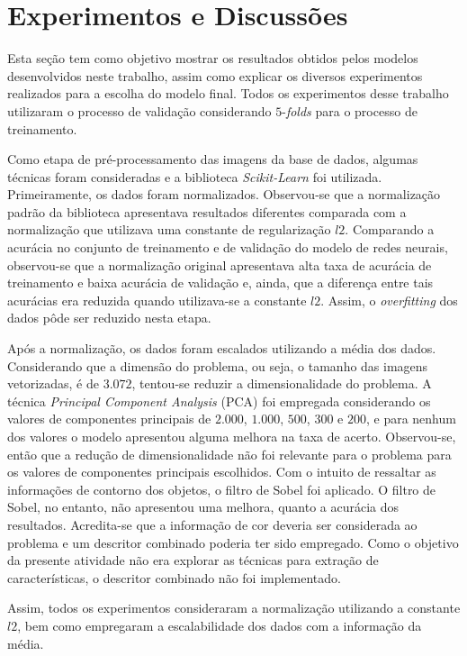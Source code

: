 \documentclass[conference]{IEEEtran}
\begin{document}
\section{Experimentos e Discussões} \label{sec:exp}

Esta seção tem como objetivo mostrar os resultados obtidos pelos modelos desenvolvidos neste trabalho, assim como explicar os diversos experimentos realizados para a escolha do modelo final. Todos os experimentos desse trabalho utilizaram o processo de validação considerando $5$-\emph{folds} para o processo de treinamento. 

Como etapa de pré-processamento das imagens da base de dados, algumas técnicas foram consideradas e a biblioteca \emph{Scikit-Learn} foi utilizada. Primeiramente, os dados foram normalizados. Observou-se que a normalização padrão da biblioteca apresentava resultados diferentes comparada com a normalização que utilizava uma constante de regularização $l2$. Comparando a acurácia no conjunto de treinamento e de validação do modelo de redes neurais, observou-se que a normalização original apresentava alta taxa de acurácia de treinamento e baixa acurácia de validação e, ainda, que a diferença entre tais acurácias era reduzida quando utilizava-se a constante $l2$. Assim, o \emph{overfitting} dos dados pôde ser reduzido nesta etapa.

Após a normalização, os dados foram escalados utilizando a média dos dados. Considerando que a dimensão do problema, ou seja, o tamanho das imagens vetorizadas, é de $3.072$, tentou-se reduzir a dimensionalidade do problema.  A técnica \emph{Principal Component Analysis} (PCA) foi empregada considerando os valores de componentes principais de $2.000$, $1.000$, $500$, $300$ e $200$, e para nenhum dos valores o modelo apresentou alguma melhora na taxa de acerto. Observou-se, então que a redução de dimensionalidade não foi relevante para o problema para os valores de componentes principais escolhidos. Com o intuito de ressaltar as informações de contorno dos objetos, o filtro de Sobel foi aplicado. O filtro de Sobel, no entanto, não apresentou uma melhora, quanto a acurácia dos resultados. Acredita-se que a informação de cor deveria ser considerada ao problema e um descritor combinado poderia ter sido empregado. Como o objetivo da presente atividade não era explorar as técnicas para extração de características, o descritor combinado não foi implementado.

Assim, todos os experimentos consideraram a normalização utilizando a constante $l2$, bem como empregaram a escalabilidade dos dados com a informação da média.
\end{document}
